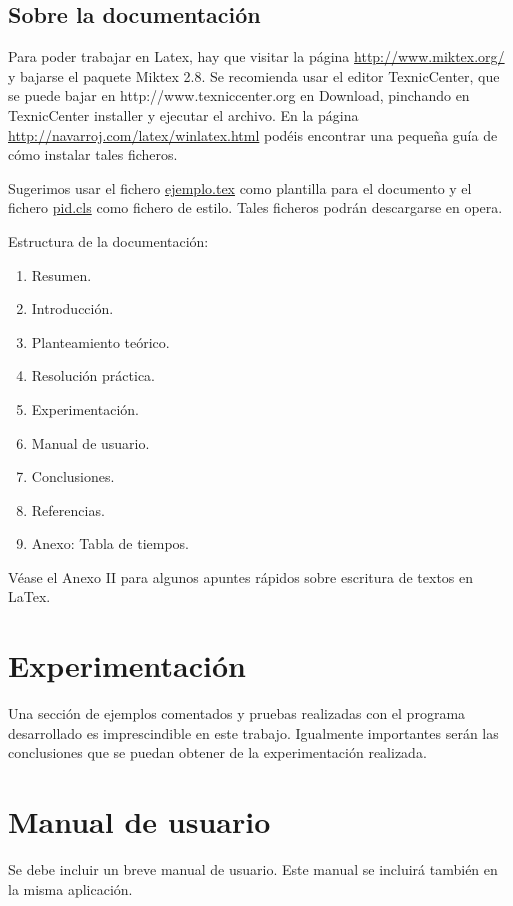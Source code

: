 \documentclass{pid}
\begin{document}
\subsection{Sobre la documentación}

 Para poder trabajar en Latex, hay que visitar la página \url{http://www.miktex.org/} y bajarse el paquete Miktex 2.8.
Se recomienda usar el editor TexnicCenter, que se puede bajar en  http://www.texniccenter.org en Download, pinchando en TexnicCenter installer y ejecutar el archivo.
En la página \url{http://navarroj.com/latex/winlatex.html} podéis encontrar una pequeña guía de cómo instalar tales ficheros.

Sugerimos usar el fichero \url{ejemplo.tex} como plantilla para el documento y el fichero \url{pid.cls} como fichero de estilo.
Tales ficheros podrán descargarse en opera.

Estructura de la documentación:

\begin{enumerate}
\item  Resumen.
\item  Introducción.
\item  Planteamiento teórico.
\item  Resolución práctica.
\item  Experimentación.
\item  Manual de usuario.
\item  Conclusiones.
\item  Referencias.
\item  Anexo: Tabla de tiempos.
\end{enumerate}

Véase el Anexo II para algunos apuntes rápidos sobre escritura de textos en LaTex.

\section{Experimentación}

Una sección de ejemplos comentados y pruebas realizadas con el programa desarrollado es imprescindible en este trabajo. Igualmente importantes serán las conclusiones que se puedan obtener de la experimentación realizada.

\section{Manual de usuario}

Se debe incluir un breve manual de usuario. Este manual se incluirá también en la misma aplicación.
\end{document}
